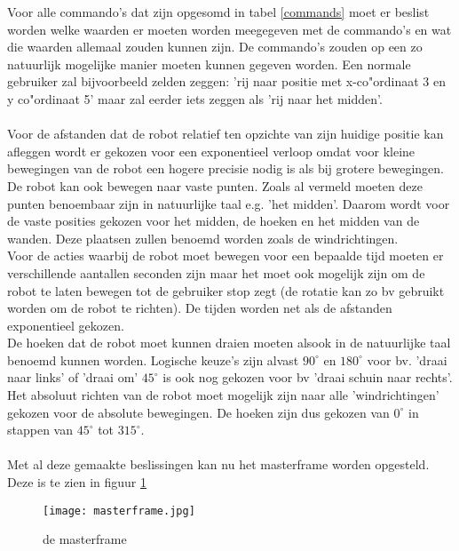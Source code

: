 Voor alle commando's dat zijn opgesomd in tabel \ref{commands} moet er beslist worden welke waarden er moeten worden meegegeven met de commando's en wat die waarden allemaal zouden kunnen zijn. De commando's zouden op een zo natuurlijk mogelijke manier moeten kunnen gegeven worden. Een normale gebruiker zal bijvoorbeeld zelden zeggen: 'rij naar positie met x-co"ordinaat 3 en y co"ordinaat 5' maar zal eerder iets zeggen als 'rij naar het midden'.\\
\\
Voor de afstanden dat de robot relatief ten opzichte van zijn huidige positie kan afleggen wordt er gekozen voor een exponentieel verloop omdat voor kleine bewegingen van de robot een hogere precisie nodig is als bij grotere bewegingen.\\
De robot kan ook bewegen naar vaste punten. Zoals al vermeld moeten deze punten benoembaar zijn in natuurlijke taal e.g. 'het midden'. Daarom wordt voor de vaste posities gekozen voor het midden, de hoeken en het midden van de wanden. Deze plaatsen zullen benoemd worden zoals de windrichtingen.\\
Voor de acties waarbij de robot moet bewegen voor een bepaalde tijd moeten er verschillende aantallen seconden zijn maar het moet ook mogelijk zijn om de robot te laten bewegen tot de gebruiker stop zegt (de rotatie kan zo bv gebruikt worden om de robot te richten). De tijden worden net als de afstanden exponentieel gekozen.\\
De hoeken dat de robot moet kunnen draien moeten alsook in de natuurlijke taal benoemd kunnen worden. Logische keuze's zijn alvast $90^\circ$ en $180^\circ$ voor bv. 'draai naar links' of 'draai om'  $45^\circ$ is ook nog gekozen voor bv 'draai schuin naar rechts'.\\
Het absoluut richten van de robot moet mogelijk zijn naar alle 'windrichtingen' gekozen voor de absolute bewegingen. De hoeken zijn dus gekozen van $0^\circ$ in stappen van $45^\circ$ tot $315^\circ$.\\
\\
Met al deze gemaakte beslissingen kan nu het masterframe worden opgesteld. Deze is te zien in figuur \ref{masterframe}

\begin{figure}[h]
\texttt{[image: masterframe.jpg]}
\label{masterframe}
\centering
\caption{de masterframe}
\end{figure}
